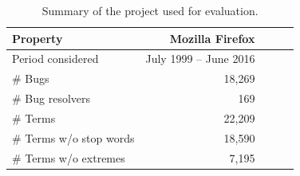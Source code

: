 \begin{table}[t]
    \centering
    \caption{Summary of the \mozff{} project used for evaluation.}
	\setlength{\tabcolsep}{4.0pt}%
    \label{tab:dataset}
    \begin{tabular}{lrrrr}
      \toprule
      \textbf{Property} & \textbf{Mozilla Firefox} \\
      \midrule
      Period considered & July 1999 -- June 2016 \\
      \# Bugs & 18,269 \\
      \# Bug resolvers & 169 \\
      \# Terms & 22,209 \\
      \# Terms w/o stop words & 18,590 \\
      \# Terms w/o extremes & 7,195 & \\
    \bottomrule
  \end{tabular}
\end{table}